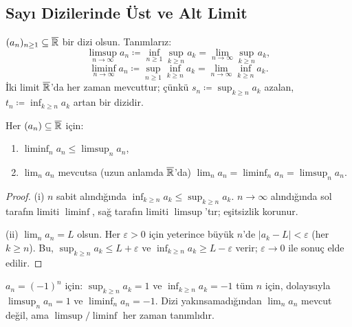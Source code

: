 \subsection{Sayı Dizilerinde Üst ve Alt Limit}

\begin{tanim}\label{def:limsup_sayi}
$(a_n)_{n \geq 1} \subseteq \overline{\mathbb{R}}$ bir dizi olsun. Tanımlarız:
\[
  \limsup_{n \to \infty} a_n
  \coloneqq \inf_{n \geq 1} \sup_{k \geq n} a_k
  = \lim_{n\to\infty} \sup_{k \geq n} a_k,
\]
\[
  \liminf_{n \to \infty} a_n
  \coloneqq \sup_{n \geq 1} \inf_{k \geq n} a_k
  = \lim_{n\to\infty} \inf_{k \geq n} a_k.
\]
İki limit $\overline{\mathbb{R}}$'da her zaman mevcuttur; çünkü $s_n \coloneqq \sup_{k \geq n} a_k$
azalan, $t_n \coloneqq \inf_{k \geq n} a_k$ artan bir dizidir.
\end{tanim}

\begin{onerme}\label{prop:limsup_ozellik}
Her $(a_n) \subseteq \overline{\mathbb{R}}$ için:
\begin{enumerate}[label=(\roman*)]
  \item $\liminf_n a_n \leq \limsup_n a_n$,
  \item $\lim_n a_n$ mevcutsa (uzun anlamda $\overline{\mathbb{R}}$'da)
        $\lim_n a_n = \liminf_n a_n = \limsup_n a_n$.
\end{enumerate}
\end{onerme}

\begin{proof}
(i) $n$ sabit alındığında $\inf_{k \geq n} a_k \leq \sup_{k \geq n} a_k$.
$n \to \infty$ alındığında sol tarafın limiti $\liminf$, sağ tarafın limiti
$\limsup$'tır; eşitsizlik korunur.

(ii) $\lim_n a_n = L$ olsun. Her $\varepsilon > 0$ için yeterince büyük
$n$'de $|a_k - L| < \varepsilon$ (her $k \geq n$). Bu,
$\sup_{k \geq n} a_k \leq L + \varepsilon$ ve
$\inf_{k \geq n} a_k \geq L - \varepsilon$ verir; $\varepsilon \to 0$
ile sonuç elde edilir.
\end{proof}

\begin{ornek}
$a_n = (-1)^n$ için: $\sup_{k \geq n} a_k = 1$ ve $\inf_{k \geq n} a_k = -1$
tüm $n$ için, dolayısıyla
$\limsup_n a_n = 1$ ve $\liminf_n a_n = -1$.
Dizi yakınsamadığından $\lim_n a_n$ mevcut değil, ama $\limsup/\liminf$
her zaman tanımlıdır.
\end{ornek}

